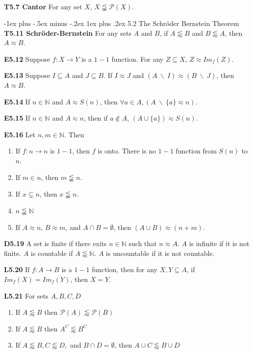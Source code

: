 \documentclass[10pt, landscape]{article}
\makeatletter
\renewcommand{\subsection}{\@startsection{subsection}{3}{0mm}%
                                {-1ex plus -.5ex minus -.2ex}%
                                {1ex plus .2ex}%
                                {\normalfont\small\bfseries}}%
\makeatother
\begin{document}
\begin{multicols*}{3}
\textbf{T5.7 Cantor} For any set $X$, $X \lnapprox \mathcal{P}(X)$.

\subsection{5.2 The Schröder Bernstein Theorem}
\textbf{T5.11 Schröder-Bernstein} For any sets $A$ and $B$, if $A \lessapprox B$ and $B \lessapprox A$, then $A \approx B$.

\textbf{E5.12} Suppose $f:X \rightarrow Y$ is a $1-1$ function. For any $Z \subseteq X$, $Z \approx Im_f(Z)$.

\textbf{E5.13} Suppose $I \subseteq A$ and $J \subseteq B$. If $I \approx J$ and $(A \ \backslash \ I) \approx (B \ \backslash \ J)$, then $A \approx B$.

\textbf{E5.14} If $n \in \mathbb{N}$ and $A \approx S(n)$, then $\forall a \in A, ( A \ \backslash \ \{a\} \approx n)$.

\textbf{E5.15} If $n \in \mathbb{N}$ and $A \approx n$, then if $a \notin A$, $(A \cup \{a\}) \approx S(n)$.

\textbf{E5.16} Let $n, m \in \mathbb{N}$. Then
\begin{enumerate}
    \item If $f:n \rightarrow n$ is $1-1$, then $f$ is onto. There is no $1-1$ function from $S(n)$ to $n$.
    \item If $m \in n$, then $m \lnapprox n$.
    \item If $x \subsetneq n$, then $x \lnapprox n$.
    \item $n \lnapprox \mathbb{N}$
    \item If $A \approx n$, $B \approx m$, and $A \cap B = \emptyset$, then $(A \cup B) \approx (n+m)$.
\end{enumerate}

\textbf{D5.19} A set is finite if there exits $n \in \mathbb{N}$ such that $n \approx A$. $A$ is infinite if it is not finite. $A$ is countable if $A \lessapprox \mathbb{N}$. $A$ is uncountable if it is not countable.

\textbf{L5.20} If $f:A\rightarrow B$ is a $1-1$ function, then for any $X,Y\subseteq A$, if $Im_f(X)=Im_f(Y)$, then $X=Y$.

\textbf{L5.21} For sets $A,B,C,D$
\begin{enumerate}
    \item If $A \lessapprox B$ then $\mathcal{P}(A) \lessapprox \mathcal{P}(B)$
    \item If $A \lessapprox B$ then $A^C \lessapprox B^C$
    \item If $A \lessapprox B, C \lessapprox D,$ and $B \cap D = \emptyset$, then $A\cup C \lessapprox B \cup D$
\end{enumerate}


\end{multicols*}
\end{document}
